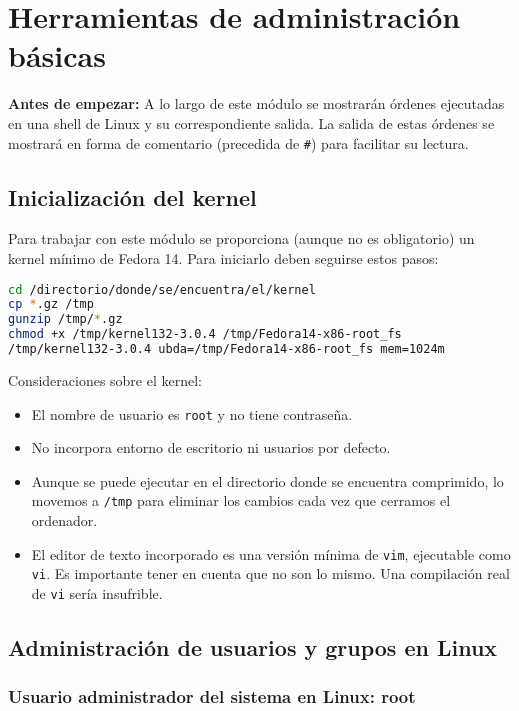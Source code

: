 \section{Herramientas de administración básicas}

\textbf{Antes de empezar:} A lo largo de este módulo se mostrarán órdenes ejecutadas en una shell de Linux y su correspondiente salida.
La salida de estas órdenes se mostrará en forma de comentario (precedida de \texttt{\#}) para facilitar su lectura.

\subsection{Inicialización del kernel}

Para trabajar con este módulo se proporciona (aunque no es obligatorio) un kernel mínimo de Fedora 14.
Para iniciarlo deben seguirse estos pasos:

\begin{lstlisting}[language=Bash]
cd /directorio/donde/se/encuentra/el/kernel
cp *.gz /tmp
gunzip /tmp/*.gz
chmod +x /tmp/kernel132-3.0.4 /tmp/Fedora14-x86-root_fs
/tmp/kernel132-3.0.4 ubda=/tmp/Fedora14-x86-root_fs mem=1024m
\end{lstlisting}

Consideraciones sobre el kernel:

\begin{itemize}
	\item El nombre de usuario es \texttt{root} y no tiene contraseña.
	\item No incorpora entorno de escritorio ni usuarios por defecto.
	\item Aunque se puede ejecutar en el directorio donde se encuentra comprimido, lo movemos a \texttt{/tmp} para eliminar los cambios cada vez que cerramos el ordenador.
	\item El editor de texto incorporado es una versión mínima de \texttt{vim}, ejecutable como \texttt{vi}. Es importante tener en cuenta que no son lo mismo. Una compilación real de \texttt{vi} sería insufrible.
\end{itemize}

\subsection{Administración de usuarios y grupos en Linux}

\subsubsection{Usuario administrador del sistema en Linux: root}

